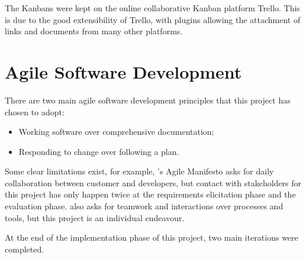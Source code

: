 The Kanbans were kept on the online collaborative Kanban platform Trello. This is due to 
the good extensibility of Trello, with plugins allowing the attachment of links and documents 
from many other platforms.


\section{Agile Software Development}

There are two main agile software development principles that this project has chosen to adopt:

\begin{itemize}
    \setlength\itemsep{0em}        
    \item Working software over comprehensive documentation;
    \item Responding to change over following a plan.\\
    \citep{beck2001agile}    
\end{itemize}

Some clear limitations exist, for example, \citet{beck2001agile}'s Agile Manifesto asks for 
daily collaboration between customer and developers, but contact with stakeholders 
for this project has only happen twice at the requirements elicitation 
phase and the evaluation phase. \citet{beck2001agile} also asks for teamwork and 
interactions over processes and tools, but this project is an individual endeavour.

At the end of the implementation phase of this project, two main iterations were completed.

